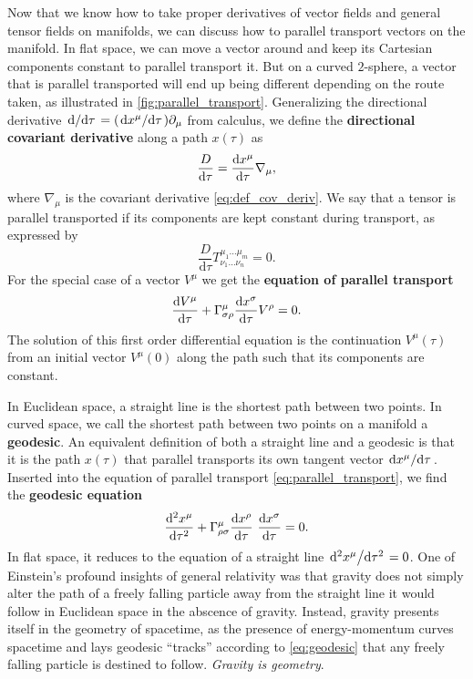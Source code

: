 Now that we know how to take proper derivatives of vector fields and general tensor fields on manifolds, we can discuss how to parallel transport vectors on the manifold.
In flat space, we can move a vector around and keep its Cartesian components constant to parallel transport it.
But on a curved $2$-sphere, a vector that is parallel transported will end up being different depending on the route taken, as illustrated in \cref{fig:parallel_transport}.
Generalizing the directional derivative $\odv{}/{\tau} = (\odv{x^\mu}/{\tau}) \partial_\mu$ from calculus, we define the \textbf{directional covariant derivative} along a path $x(\tau)$ as
\begin{equation}
	\frac{D}{\mathrm{d} \tau} = \odv{x^\mu}{\tau} \nabla_\mu,
\end{equation}
where $\nabla_\mu$ is the covariant derivative \eqref{eq:def_cov_deriv}.
We say that a tensor is parallel transported if its components are kept constant during transport, as expressed by
\begin{equation}
	\frac{D}{\mathrm{d} \tau} T^{\mu_1 \ldots \mu_m}_{\nu_1 \ldots \nu_n} = 0 .
\end{equation}
For the special case of a vector $V^\mu$ we get the \textbf{equation of parallel transport}
\begin{equation}
	\odv{V^\mu}{\tau} + \Gamma^{\mu}_{\sigma \rho} \odv{x^\sigma}{\tau} V^\rho = 0 .
	\label{eq:parallel_transport}
\end{equation}
The solution of this first order differential equation is the continuation $V^\mu(\tau)$ from an initial vector $V^\mu(0)$ along the path such that its components are constant.

In Euclidean space, a straight line is the shortest path between two points.
In curved space, we call the shortest path between two points on a manifold a \textbf{geodesic}.
An equivalent definition of both a straight line and a geodesic is that it is the path $x(\tau)$ that parallel transports its own tangent vector $\odv{x^\mu}/{\tau}$.
Inserted into the equation of parallel transport \eqref{eq:parallel_transport}, we find the \textbf{geodesic equation}
\begin{equation}
	\odv[2]{x^\mu}{\tau} + \Gamma^\mu_{\rho \sigma} \odv{x^\rho}{\tau} \odv{x^\sigma}{\tau} = 0 .
	\label{eq:geodesic}
\end{equation}
In flat space, it reduces to the equation of a straight line $\odv[2]{x^\mu}/{\tau} = 0$.
One of Einstein's profound insights of general relativity was that gravity does not simply alter the path of a freely falling particle away from the straight line it would follow in Euclidean space in the abscence of gravity.
Instead, gravity presents itself in the geometry of spacetime, as the presence of energy-momentum curves spacetime and lays geodesic ``tracks'' according to \cref{eq:geodesic} that any freely falling particle is destined to follow.
\emph{Gravity is geometry}.

